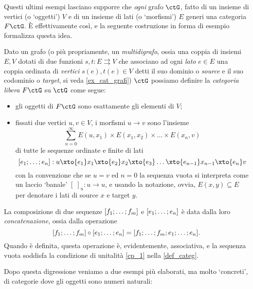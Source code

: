 Questi ultimi esempi lasciano supporre che \emph{ogni} grafo \(\ctG\), fatto di un insieme di vertici (o `oggetti') \(V\) e di un insieme di lati (o `morfismi') \(E\) generi una categoria \(F\ctG\). \`E effettivamente così, e la seguente costruzione in forma di esempio formalizza questa idea.
\begin{example}\label{ex_cat_libera}
	Dato un grafo (o più propriamente, un \emph{multidigrafo}, ossia una coppia di insiemi \(E,V\) dotati di due funzioni \(s,t : E\rightrightarrows V\) che associano ad ogni \emph{lato} \(e\in E\) una coppia ordinata di \emph{vertici} \(s(e),t(e)\in V\) detti il suo dominio o \emph{source} e il suo codominio o \emph{target}, si veda \ref{ex_cat_grafi}) \(\ctG\) possiamo definire la \emph{categoria libera} \(F\ctG\) su \(\ctG\) come segue:
	\begin{itemize}
		\item gli oggetti di \(F\ctG\) sono esattamente gli elementi di \(V\);
		\item fissati due vertici \(u,v\in V\), i morfismi \(u\to v\) sono l'insieme
		      \[\sum_{n=0}^\infty E(u,x_1)\times E(x_1,x_2)\times\dots\times E(x_n,v)\]
		      di tutte le sequenze ordinate e finite di lati
		      \[ [\tup en;] : u \xto{e_1} x_1 \xto{e_2} x_2\xto{e_3} \dots\xto{e_{n-1}} x_{n-1}\xto{e_n} v\]
		      con la convenzione che se \(u=v\) ed \(n=0\) la sequenza vuota si interpreta come un laccio `banale' \([\;]_u : u\to u\), e usando la notazione, ovvia, \(E(x,y)\subseteq E\) per denotare i lati di source \(x\) e target \(y\).
	\end{itemize}
	La composizione di due sequenze \([\tup fm;]\) e \([\tup en;]\) è data dalla loro \emph{concatenazione}, ossia dalla operazione
	\[[\tup fm;]\cmp[\tup en;] = [\tup fm;;\tup en;].\]
	Quando è definita, questa operazione è, evidentemente, associativa, e la sequenza vuota soddisfa la condizione di unitalità \ref{cp_1} nella \ref{def_categ}.
\end{example}
Dopo questa digressione veniamo a due esempi più elaborati, ma molto `concreti', di categorie dove gli oggetti sono numeri naturali:
